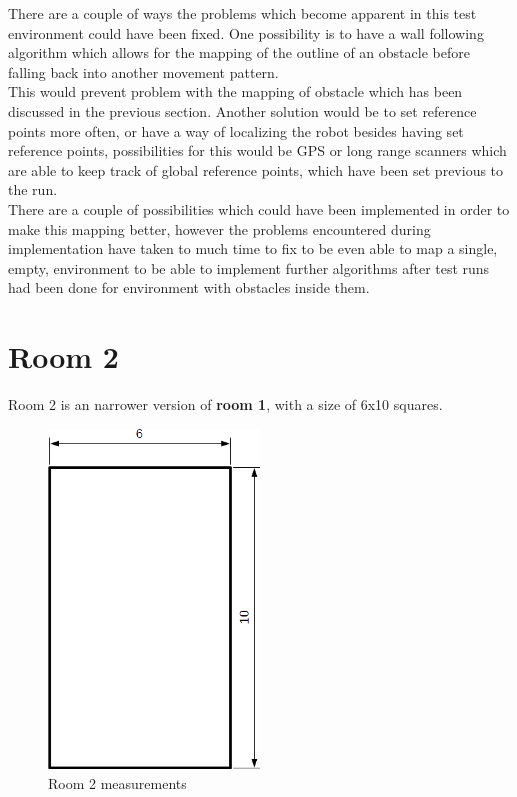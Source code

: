There are a couple of ways the problems which become apparent in this test environment could have been fixed. One possibility is to have a wall following algorithm which allows for the mapping of the outline of an obstacle before falling back into another movement pattern. \\
This would prevent problem with the mapping of obstacle which has been discussed in the previous section. Another solution would be to set reference points more often, or have a way of localizing the robot besides having set reference points, possibilities for this would be GPS or long range scanners which are able to keep track of global reference points, which have been set previous to the run.\\
There are a couple of possibilities which could have been implemented in order to make this mapping better, however the problems encountered during implementation have taken to much time to fix to be even able to map a single, empty, environment to be able to implement further algorithms after test runs had been done for environment with obstacles inside them.

\section{Room 2}
Room 2 is an narrower version of \textbf{room 1}, with a size of 6x10 squares.

\begin{figure}[h]
\centering
\includegraphics[width = 0.5\textwidth]{../../figures/room2_empty.png}
\caption{Room 2 measurements}
\label{room2_empty}
\end{figure}

